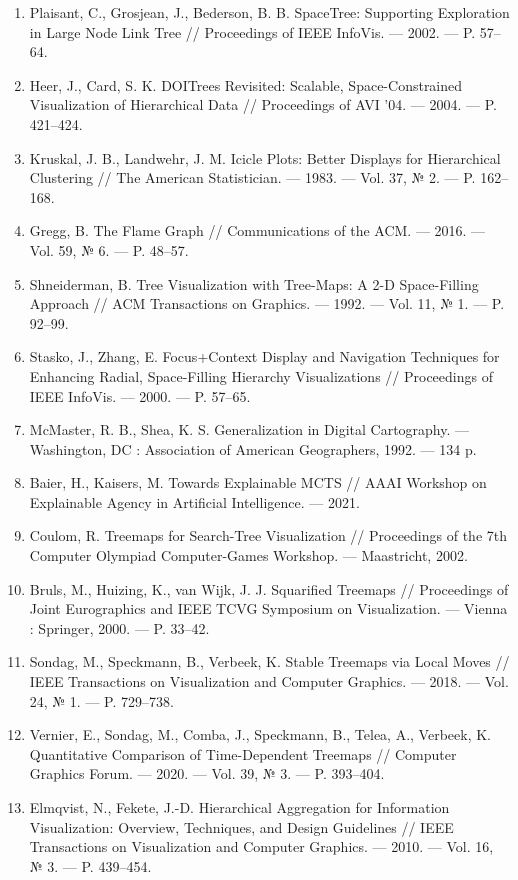 \begin{enumerate}[label=\arabic*.]
  \item Plaisant, C., Grosjean, J., Bederson, B. B. SpaceTree: Supporting Exploration in Large Node Link Tree // Proceedings of IEEE InfoVis. — 2002. — P. 57–64.
  \item Heer, J., Card, S. K. DOITrees Revisited: Scalable, Space-Constrained Visualization of Hierarchical Data // Proceedings of AVI '04. — 2004. — P. 421–424.
  \item Kruskal, J. B., Landwehr, J. M. Icicle Plots: Better Displays for Hierarchical Clustering // The American Statistician. — 1983. — Vol. 37, № 2. — P. 162–168.
  \item Gregg, B. The Flame Graph // Communications of the ACM. — 2016. — Vol. 59, № 6. — P. 48–57.
  \item Shneiderman, B. Tree Visualization with Tree-Maps: A 2-D Space-Filling Approach // ACM Transactions on Graphics. — 1992. — Vol. 11, № 1. — P. 92–99.
  \item Stasko, J., Zhang, E. Focus+Context Display and Navigation Techniques for Enhancing Radial, Space-Filling Hierarchy Visualizations // Proceedings of IEEE InfoVis. — 2000. — P. 57–65.
  \item McMaster, R. B., Shea, K. S. Generalization in Digital Cartography. — Washington, DC : Association of American Geographers, 1992. — 134 p.
  \item Baier, H., Kaisers, M. Towards Explainable MCTS // AAAI Workshop on Explainable Agency in Artificial Intelligence. — 2021.
  \item Coulom, R. Treemaps for Search-Tree Visualization // Proceedings of the 7th Computer Olympiad Computer-Games Workshop. — Maastricht, 2002.
  \item Bruls, M., Huizing, K., van Wijk, J. J. Squarified Treemaps // Proceedings of Joint Eurographics and IEEE TCVG Symposium on Visualization. — Vienna : Springer, 2000. — P. 33–42.
  \item Sondag, M., Speckmann, B., Verbeek, K. Stable Treemaps via Local Moves // IEEE Transactions on Visualization and Computer Graphics. — 2018. — Vol. 24, № 1. — P. 729–738.
  \item Vernier, E., Sondag, M., Comba, J., Speckmann, B., Telea, A., Verbeek, K. Quantitative Comparison of Time-Dependent Treemaps // Computer Graphics Forum. — 2020. — Vol. 39, № 3. — P. 393–404.
  \item Elmqvist, N., Fekete, J.-D. Hierarchical Aggregation for Information Visualization: Overview, Techniques, and Design Guidelines // IEEE Transactions on Visualization and Computer Graphics. — 2010. — Vol. 16, № 3. — P. 439–454.

\end{enumerate}
